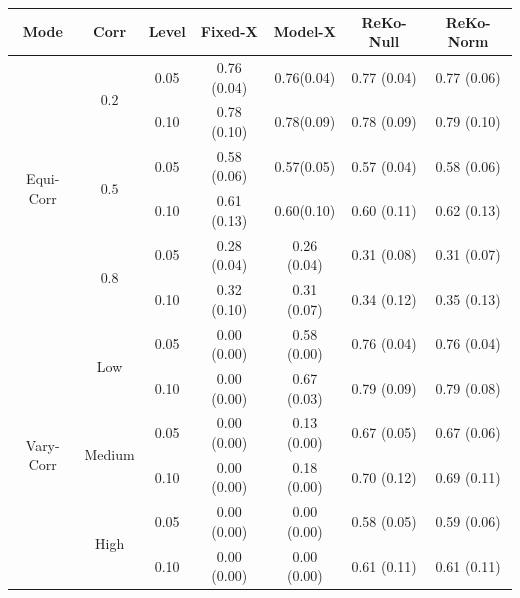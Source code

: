 \documentclass[12pt,Times]{article}
\begin{document}
\begin{table}[htp]
\begin{center}
{%
\begin{tabular}{ccccccc}
Mode&Corr&Level & Fixed-X & Model-X & ReKo-Null & ReKo-Norm \\
\hline
\multirow{6}{*}{Equi-Corr}
&\multirow{2}{*}{$0.2$}
&0.05&0.76 (0.04)&0.76(0.04)& 0.77 (0.04)&0.77 (0.06)\\
&&0.10&0.78 (0.10)&0.78(0.09)& 0.78 (0.09)&0.79 (0.10)\\
\cline{2-7}
&\multirow{2}{*}{$0.5$}
&0.05& 0.58 (0.06)&0.57(0.05)&0.57 (0.04)&0.58 (0.06)\\
&&0.10& 0.61 (0.13)&0.60(0.10)&0.60 (0.11)&0.62 (0.13)\\
\cline{2-7}
&\multirow{2}{*}{$0.8$}
&0.05&0.28 (0.04)&0.26 (0.04)&0.31 (0.08)&0.31 (0.07)\\
&&0.10&0.32 (0.10)&0.31 (0.07)&0.34 (0.12)&0.35 (0.13)\\
\hline
\multirow{6}{*}{Vary-Corr}
&\multirow{2}{*}{Low}
&0.05&0.00 (0.00)&0.58 (0.00)&0.76 (0.04)&0.76 (0.04)\\
&&0.10&0.00 (0.00)&0.67 (0.03)&0.79 (0.09)&0.79 (0.08)\\
\cline{2-7}
&\multirow{2}{*}{Medium}
&0.05&0.00 (0.00)&0.13 (0.00)&0.67 (0.05)&0.67 (0.06)\\
&&0.10&0.00 (0.00)&0.18 (0.00)&0.70 (0.12)&0.69 (0.11)\\
\cline{2-7}
&\multirow{2}{*}{High}
&0.05&0.00 (0.00)&0.00 (0.00)&0.58 (0.05)&0.59 (0.06)\\
&&0.10&0.00 (0.00)&0.00 (0.00)&0.61 (0.11)&0.61 (0.11)\\
\hline
\end{tabular}
}
\end{center}
\vspace{-0.1in}

\end{table}
\end{document}

